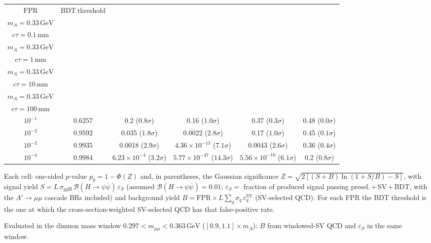 \documentclass[10pt,a4paper]{article}
\begin{document}
{\begin{tabular}{cccccc}
\toprule
$\mathrm{FPR}$ & $\mathrm{BDT\ threshold}$ & \shortstack{$m_{\pi}=1\,\mathrm{GeV}$\\$m_{A}=0.33\,\mathrm{GeV}$\\$c\tau=0.1\,\mathrm{mm}$} & \shortstack{$m_{\pi}=1\,\mathrm{GeV}$\\$m_{A}=0.33\,\mathrm{GeV}$\\$c\tau=1\,\mathrm{mm}$} & \shortstack{$m_{\pi}=1\,\mathrm{GeV}$\\$m_{A}=0.33\,\mathrm{GeV}$\\$c\tau=10\,\mathrm{mm}$} & \shortstack{$m_{\pi}=1\,\mathrm{GeV}$\\$m_{A}=0.33\,\mathrm{GeV}$\\$c\tau=100\,\mathrm{mm}$} \\
\midrule
$10^{-1}$ & $0.6257$ & 0.2 ($0.8\sigma$) & 0.16 ($1.0\sigma$) & 0.37 ($0.3\sigma$) & 0.48 ($0.0\sigma$)\\
$10^{-2}$ & $0.9592$ & 0.035 ($1.8\sigma$) & 0.0022 ($2.8\sigma$) & 0.17 ($1.0\sigma$) & 0.45 ($0.1\sigma$)\\
$10^{-3}$ & $0.9935$ & 0.0018 ($2.9\sigma$) & $4.36\times10^{-13}$ ($7.1\sigma$) & 0.0043 ($2.6\sigma$) & 0.36 ($0.4\sigma$)\\
$10^{-4}$ & $0.9984$ & $6.23\times10^{-4}$ ($3.2\sigma$) & $5.77\times10^{-47}$ ($14.3\sigma$) & $5.56\times10^{-10}$ ($6.1\sigma$) & 0.2 ($0.8\sigma$)\\
\bottomrule
\end{tabular}

{\small Each cell: one-sided $p$-value $p_0=1-\Phi(Z)$ and, in parentheses, the Gaussian significance $Z=\sqrt{2\left[(S{+}B)\ln(1{+}S/B)-S\right]}$, with signal yield $S=L\,\sigma_{\mathrm{ggH}}\,\mathcal{B}(H\to\psi\bar{\psi})\,\varepsilon_S$ (assumed $\mathcal{B}(H\to\psi\bar{\psi})=0.01$; $\varepsilon_S=$ fraction of produced signal passing presel.\,$+$\,SV\,$+$\,BDT, with the $A'\to\mu\mu$ cascade BRs included) and background yield $B=\mathrm{FPR}\times L\sum_q\sigma_q\,\varepsilon_q^{\mathrm{SV}}$ (SV-selected QCD). For each FPR the BDT threshold is the one at which the cross-section-weighted SV-selected QCD has that false-positive rate.}

{\small Evaluated in the dimuon mass window $0.297<m_{\mu\mu}<0.363\,\mathrm{GeV}$ ($[0.9,1.1]\times m_A$): $B$ from windowed-SV QCD and $\varepsilon_S$ in the same window.}

}\clearpage
\end{document}
